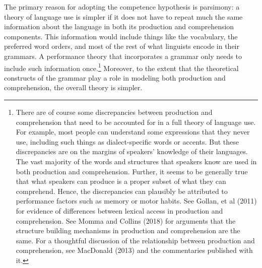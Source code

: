 \documentclass[a4paper]{article}
\begin{document}
The primary reason for adopting the competence hypothesis is parsimony:  a theory of language use is simpler if it does not have to repeat much the same information about the language in both its production and comprehension components.  This information would include things like the vocabulary, the preferred word orders, and most of the rest of what linguists encode in their grammars.  A performance theory that incorporates a grammar only needs to include such information once.\footnote{There are of course some discrepancies between production and comprehension that need to be accounted for in a full theory of language use.  For example, most people can understand some expressions that they never use, including such things as dialect-specific words or accents.  But these discrepancies are on the margins of speakers' knowledge of their languages.  The vast majority of the words and structures that speakers know are used in both production and comprehension.  Further, it seems to be generally true that what speakers can produce is a proper subset of what they can comprehend.  Hence, the discrepancies can plausibly be attributed to performance factors such as memory or motor habits.  See Gollan, et al (2011) for evidence of differences between lexical access in production and comprehension.  See Momma and Collins (2018) for arguments that the structure building mechanisms in production and comprehension are the same.  For a thoughtful discussion of the relationship between production and comprehension, see MacDonald (2013) and the commentaries published with it.}  Moreover, to the extent that the theoretical constructs of the grammar play a role in modeling both production and comprehension, the overall theory is simpler.
\end{document}
